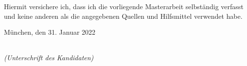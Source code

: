 %
%
%
%

\newpage

\thispagestyle{empty}

\begin{large}

    \vspace*{2cm}

    \noindent
    Hiermit versichere ich, dass ich die vorliegende Masterarbeit
    selbständig verfasst und keine anderen als die angegebenen Quellen
    und Hilfsmittel verwendet habe.

    \vspace{2cm}

    \noindent
    München, den 31. Januar 2022

    \vspace{3cm}

    \hspace*{7cm}%
    \dotfill\\
    \hspace*{8.5cm}%
    \textit{(Unterschrift des Kandidaten)}

\end{large}

